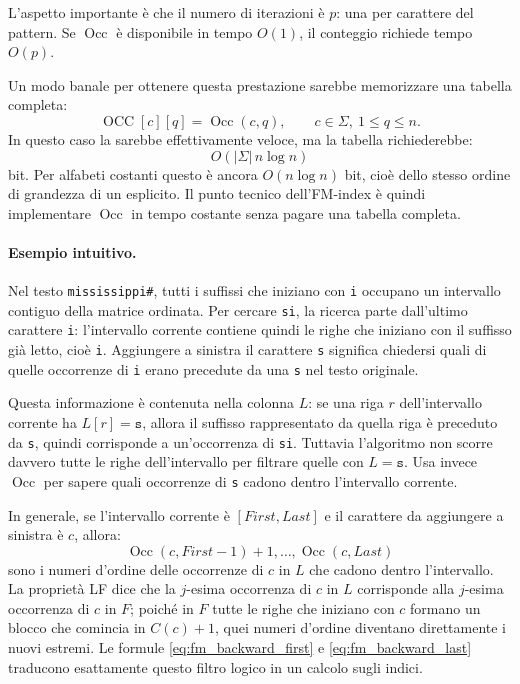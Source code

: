 \documentclass{article}
\theoremstyle{definition}
\numberwithin{equation}{section}
\begin{document}
L'aspetto importante è che il numero di iterazioni è $p$: una per carattere del pattern. Se $\operatorname{Occ}$ è disponibile in tempo $O(1)$, il conteggio richiede tempo $O(p)$.

Un modo banale per ottenere questa prestazione sarebbe memorizzare una tabella completa:
\[
    \operatorname{OCC}[c][q]
    =
    \operatorname{Occ}(c,q),
    \qquad
    c\in\Sigma,\ 1\leq q\leq n.
\]
In questo caso la  sarebbe effettivamente veloce, ma la tabella richiederebbe:
\[
    O(|\Sigma|\,n\log n)
\]
bit. Per alfabeti costanti questo è ancora $O(n\log n)$ bit, cioè dello stesso ordine di grandezza di un  esplicito. Il punto tecnico dell'FM-index è quindi implementare $\operatorname{Occ}$ in tempo costante senza pagare una tabella completa.

\paragraph{Esempio intuitivo.}
Nel testo \texttt{mississippi\#}, tutti i suffissi che iniziano con \texttt{i} occupano un intervallo contiguo della matrice ordinata. Per cercare \texttt{si}, la ricerca parte dall'ultimo carattere \texttt{i}: l'intervallo corrente contiene quindi le righe che iniziano con il suffisso già letto, cioè \texttt{i}. Aggiungere a sinistra il carattere \texttt{s} significa chiedersi quali di quelle occorrenze di \texttt{i} erano precedute da una \texttt{s} nel testo originale.

Questa informazione è contenuta nella colonna $L$: se una riga $r$ dell'intervallo corrente ha $L[r]=\texttt{s}$, allora il suffisso rappresentato da quella riga è preceduto da \texttt{s}, quindi corrisponde a un'occorrenza di \texttt{si}. Tuttavia l'algoritmo non scorre davvero tutte le righe dell'intervallo per filtrare quelle con $L=\texttt{s}$. Usa invece $\operatorname{Occ}$ per sapere quali occorrenze di \texttt{s} cadono dentro l'intervallo corrente.

In generale, se l'intervallo corrente è $[\textit{First},\textit{Last}]$ e il carattere da aggiungere a sinistra è $c$, allora:
\[
    \operatorname{Occ}(c,\textit{First}-1)+1,
    \ldots,
    \operatorname{Occ}(c,\textit{Last})
\]
sono i numeri d'ordine delle occorrenze di $c$ in $L$ che cadono dentro l'intervallo. La proprietà LF dice che la $j$-esima occorrenza di $c$ in $L$ corrisponde alla $j$-esima occorrenza di $c$ in $F$; poiché in $F$ tutte le righe che iniziano con $c$ formano un blocco che comincia in $C(c)+1$, quei numeri d'ordine diventano direttamente i nuovi estremi. Le formule \eqref{eq:fm_backward_first} e \eqref{eq:fm_backward_last} traducono esattamente questo filtro logico in un calcolo sugli indici.
\end{document}
